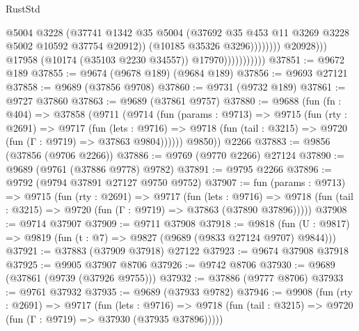 \begin{lexlean}{RustStd}
\begin{coremodule}
                                              @5004
                                              @3228
                                              (@37741
                                                @1342
                                                @35
                                                @5004
                                                (@37692
                                                  @35
                                                  @453
                                                  @11
                                                  @3269
                                                  @3228
                                                  @5002
                                                  @10592
                                                  @37754
                                                  @20912))
                                              (@10185 @35326 @3296))))))))
                                @20928)))
                          @17958
                          (@10174 (@35103 @2230 @34557))
                          @17970)))))))))))
@37851 := @9672 @189
@37855 := @9674 (@9678 @189) (@9684 @189)
@37856 := @9693 @27121
@37858 := @9689 (@37856 @9708)
@37860 := @9731 (@9732 @189)
@37861 := @9727 @37860
@37863 := @9689 (@37861 @9757)
@37880 := @9688
    (fun (fn : @404) =>
    @37858
      (@9711
        (@9714
          (fun (params : @9713) =>
          @9715
            (fun (rty : @2691) =>
            @9717
              (fun (lets : @9716) =>
              @9718 (fun (tail : @3215) => @9720 (fun (Γ : @9719) => @37863 @9804))))))
        @9850))
    @2266
@37883 := @9856 (@37856 (@9706 @2266))
@37886 := @9769 (@9770 @2266) @27124
@37890 := @9689 (@9761 (@37886 @9778) @9782)
@37891 := @9795 @2266
@37896 := @9792 (@9794 @37891 @27127 @9750 @9752)
@37907 := fun (params : @9713) =>
  @9715
    (fun (rty : @2691) =>
    @9717
      (fun (lets : @9716) =>
      @9718 (fun (tail : @3215) => @9720 (fun (Γ : @9719) => @37863 (@37890 @37896)))))
@37908 := @9714 @37907
@37909 := @9711 @37908
@37918 := @9818
    (fun (U : @9817) => @9819 (fun (t : @7) => @9827 (@9689 (@9833 @27124 @9707) @9844)))
@37921 := @37883 (@37909 @37918) @27122
@37923 := @9674 @37908 @37918
@37925 := @9905 @37907 @8706
@37926 := @9742 @8706
@37930 := @9689 (@37861 (@9739 (@37926 @9755)))
@37932 := @37886 (@9777 @8706)
@37933 := @9761 @37932
@37935 := @9689 (@37933 @9782)
@37946 := @9908
    (fun (rty : @2691) =>
    @9717
      (fun (lets : @9716) =>
      @9718 (fun (tail : @3215) => @9720 (fun (Γ : @9719) => @37930 (@37935 @37896)))))

\end{coremodule}
\end{lexlean}
